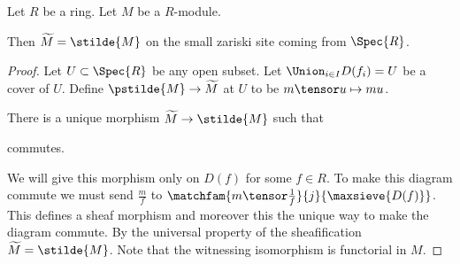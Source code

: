 \begin{lemma}
Let $R$ be a ring.
Let $M$ be a $R$-module.

Then $\widetilde{M} = \stilde{M}$ on the small zariski site coming from $\Spec{R}$.
\end{lemma}

\begin{proof}
Let $U\subset \Spec{R}$ be any open subset.
Let $\Union_{i\in I} D(f_i) = U$ be a cover of $U$.
Define $\pstilde{M} \rightarrow \widetilde{M}$
at $U$ to be $m\tensor u \mapsto mu$.

There is a unique morphism $\widetilde{M} \rightarrow \stilde{M}$
such that 
\begin{center}
\end{center}
commutes.

We will give this morphism only on $D(f)$ for some $f\in R$.
To make this diagram commute we must send $\frac{m}{f}$
to $\matchfam{m\tensor \frac{1}{f}}{j}{\maxsieve{D(f)}}$.
This defines a sheaf morphism and moreover this the unique way to make the diagram commute.
By the universal property of the sheafification $\widetilde{M} = \stilde{M}$.
Note that the witnessing isomorphism is functorial in $M$. 
\end{proof}